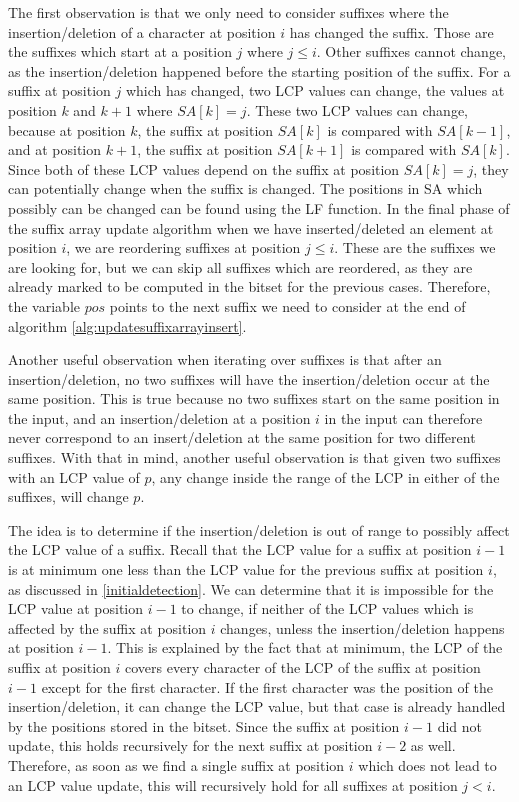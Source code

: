 The first observation is that we only need to consider suffixes where the
insertion/deletion of a character at position $i$ has changed the suffix. Those are the
suffixes which start at a position $j$ where $j \leq i$. Other suffixes cannot change, as
the insertion/deletion happened before the starting position of the suffix. For a suffix
at position $j$ which has changed, two LCP values can change, the values at position $k$
and $k + 1$ where $SA[k] = j$. These two LCP values can change, because at position $k$,
the suffix at position $SA[k]$ is compared with $SA[k - 1]$, and at position $k + 1$, the
suffix at position $SA[k + 1]$ is compared with $SA[k]$. Since both of these LCP values
depend on the suffix at position $SA[k] = j$, they can potentially change when the suffix
is changed. The positions in SA which possibly can be changed can be found using the
LF function. In the final phase of the suffix array update algorithm when we have
inserted/deleted an element at position $i$, we are reordering suffixes at position $j
\leq i$. These are the suffixes we are looking for, but we can skip all suffixes which are
reordered, as they are already marked to be computed in the bitset for the previous cases.
Therefore, the variable $pos$ points to the next suffix we need to consider at the end of
algorithm \ref{alg:updatesuffixarrayinsert}.

Another useful observation when iterating over suffixes is that after an
insertion/deletion, no two suffixes will have the insertion/deletion occur at the same
position. This is true because no two suffixes start on the same position in the input,
and an insertion/deletion at a position $i$ in the input can therefore never correspond to
an insert/deletion at the same position for two different suffixes. With that in mind,
another useful observation is that given two suffixes with an LCP value of $p$, any change
inside the range of the LCP in either of the suffixes, will change $p$.

The idea is to determine if the insertion/deletion is out of range to possibly affect the
LCP value of a suffix. Recall that the LCP value for a suffix at position $i - 1$ is at
minimum one less than the LCP value for the previous suffix at position $i$, as discussed
in \cref{initialdetection}. We can determine that it is impossible for the LCP value at
position $i - 1$ to change, if neither of the LCP values which is affected by the suffix
at position $i$ changes, unless the insertion/deletion happens at position $i - 1$. This
is explained by the fact that at minimum, the LCP of the suffix at position $i$ covers
every character of the LCP of the suffix at position $i - 1$ except for the first
character. If the first character was the position of the insertion/deletion, it can
change the LCP value, but that case is already handled by the positions stored in the
bitset. Since the suffix at position $i - 1$ did not update, this holds recursively for
the next suffix at position $i - 2$ as well. Therefore, as soon as we find a single suffix
at position $i$ which does not lead to an LCP value update, this will recursively hold for
all suffixes at position $j < i$.

